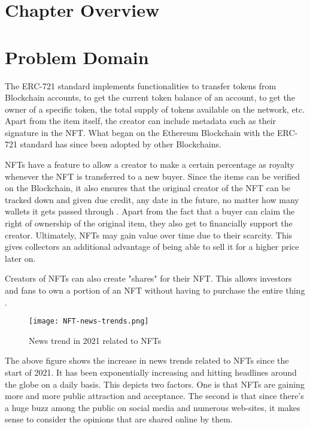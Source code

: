 

\section{Chapter Overview}

\section{Problem Domain}

The ERC-721 standard implements functionalities to transfer tokens from Blockchain accounts, to get the current token balance of an account, to get the owner of a specific token, the total supply of tokens available on the network, etc. Apart from the item itself, the creator can include metadata such as their signature in the NFT. What began on the Ethereum Blockchain with the ERC-721 standard has since been adopted by other Blockchains. 


NFTs have a feature to allow a creator to make a certain percentage as royalty whenever the NFT is transferred to a new buyer. Since the items can be verified on the Blockchain, it also ensures that the original creator of the NFT can be tracked down and given due credit, any date in the future, no matter how many wallets it gets passed through \autocite{chevet_blockchain_2018}. Apart from the fact that a buyer can claim the right of ownership of the original item, they also get to financially support the creator. Ultimately, NFTs may gain value over time due to their scarcity. This gives collectors an additional advantage of being able to sell it for a higher price later on.

Creators of NFTs can also create "shares" for their NFT. This allows investors and fans to own a portion of an NFT without having to purchase the entire thing \autocite{noauthor_erc-721_nodate}.

\begin{figure}[h!]
\centering
\texttt{[image: NFT-news-trends.png]}
\caption{News trend in 2021 related to NFTs \autocite{dowling_fertile_2021}}
\end{figure}

The above figure shows the increase in news trends related to NFTs since the start of 2021. It has been exponentially increasing and hitting headlines around the globe on a daily basis.
This depicts two factors. One is that NFTs are gaining more and more public attraction and acceptance. The second is that since there's a huge buzz among the public on social media and numerous web-sites, it makes sense to consider the opinions that are shared online by them.

